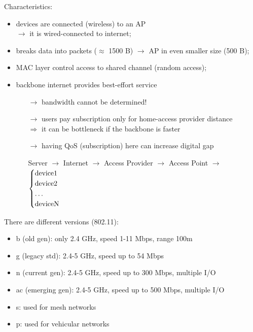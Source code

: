 Characteristics:
\begin{itemize}
    \item devices are connected (wireless) to an AP\footAP\\
    $\rightarrow$ it is wired-connected to internet;
    \item breaks data into packets ($\approx$ 1500 B) $\rightarrow$ AP\footAP
    in even smaller size (500 B);
    \item MAC layer control access to shared channel (random access);
    \item backbone internet provides best-effort service
    \begin{itemize}
        \item[$\rightarrow$] bandwidth cannot be determined!
        \item[$\rightarrow$] users pay subscription only for home-access
        provider distance\\
        $\Rightarrow$ it can be bottleneck if the backbone is faster
        \item[$\rightarrow$] having QoS (subscription) here can increase digital gap
        \vspace{0.1cm}
        \item[] Server $\rightarrow$ Internet $\rightarrow$ Access Provider $\rightarrow$
        Access Point $\rightarrow$
        $\begin{cases}
            \text{device1}&\\
            \text{device2}&\\
            \text{\dots}&\\
            \text{deviceN}& 
        \end{cases}$
    \end{itemize}
\end{itemize}

There are different versions (802.11):
\begin{itemize}
    \item b (old gen): only 2.4 GHz, speed 1-11 Mbps, range 100m
    \item g (legacy std): 2.4-5 GHz, speed up to 54 Mbps 
    \item n (current gen): 2.4-5 GHz, speed up to 300 Mbps, multiple I/O
    \item ac (emerging gen): 2.4-5 GHz, speed up to 500 Mbps, multiple I/O
    \item s: used for mesh networks
    \item p: used for vehicular networks
\end{itemize}
\newpage
